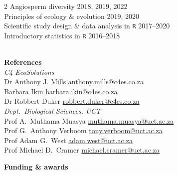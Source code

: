 \documentclass[10pt]{article}
\begin{document}
\begin{multicols}{2}
Angiosperm diversity                         \hfill {\small 2018, 2019, 2022} \\
Principles of ecology \& evolution           \hfill {\small       2019, 2020} \\
Scientific study design \& data analysis in
  \texttt{R}                                 \hfill {\small       2017--2020} \\
Introductory statistics in \texttt{R}        \hfill {\small       2016--2018} \\

\

\textbf{References} \\ %

{\small \textit{C4 EcoSolutions}} \\
Dr Anthony J. Mills
      \hfill \href{mailto:anthony.mills@c4es.co.za}{anthony.mills@c4es.co.za} \\
Barbara Ikin
      \hfill   \href{mailto:barbara.ikin@c4es.co.za}{barbara.ikin@c4es.co.za} \\
Dr Robbert Duker
      \hfill \href{mailto:robbert.duker@c4es.co.za}{robbert.duker@c4es.co.za} \\

{\small \textit{Dept.~Biological Sciences, UCT}} \\
Prof A.~Muthama Muasya
      \hfill \href{mailto:muthama.muasya@uct.ac.za}{muthama.muasya@uct.ac.za} \\
Prof G.~Anthony Verboom
      \hfill     \href{mailto:tony.verboom@uct.ac.za}{tony.verboom@uct.ac.za} \\
Prof Adam G.~West
      \hfill           \href{mailto:adam.west@uct.ac.za}{adam.west@uct.ac.za} \\
Prof Michael D.~Cramer
      \hfill \href{mailto:michael.cramer@uct.ac.za}{michael.cramer@uct.ac.za} \\

\columnbreak

\textbf{Funding \& awards} \\ %


\end{multicols}
\end{document}
